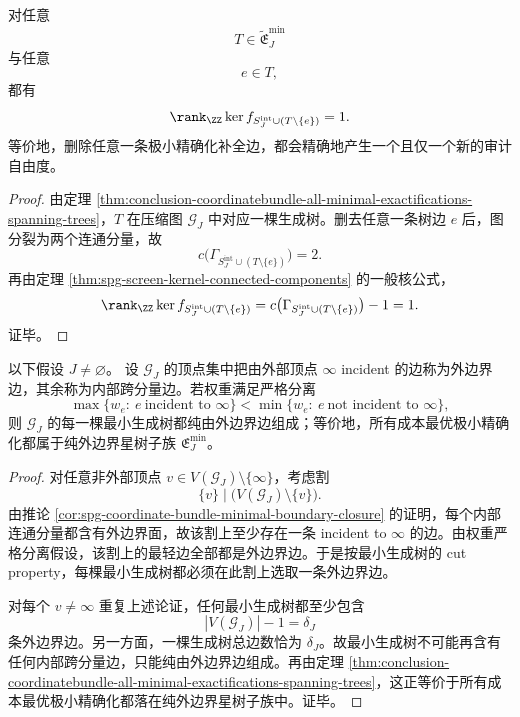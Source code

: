 \begin{theorem}[极小精确化中每一条补全边的桥边刚性]\label{thm:conclusion-coordinatebundle-minimal-exactification-bridge-rigidity}
对任意
\[
T\in \widetilde{\mathfrak E}_J^{\min}
\]
与任意
\[
e\in T,
\]
都有
\[
\rank_{\ZZ}\ker f_{S_J^{\mathrm{int}}\cup (T\setminus\{e\})}=1.
\]
等价地，删除任意一条极小精确化补全边，都会精确地产生一个且仅一个新的审计自由度。
\end{theorem}
\begin{proof}
由定理 \ref{thm:conclusion-coordinatebundle-all-minimal-exactifications-spanning-trees}，\(T\) 在压缩图 \(\mathcal G_J\) 中对应一棵生成树。删去任意一条树边 \(e\) 后，图分裂为两个连通分量，故
\[
c\bigl(\Gamma_{S_J^{\mathrm{int}}\cup (T\setminus\{e\})}\bigr)=2.
\]
再由定理 \ref{thm:spg-screen-kernel-connected-components} 的一般核公式，
\[
\rank_{\ZZ}\ker f_{S_J^{\mathrm{int}}\cup (T\setminus\{e\})}
=
c\bigl(\Gamma_{S_J^{\mathrm{int}}\cup (T\setminus\{e\})}\bigr)-1
=1.
\]
证毕。
\end{proof}

\begin{theorem}[严格边界价差强制纯星最优性]\label{thm:conclusion-coordinatebundle-strict-boundary-gap-forces-stars}
以下假设 \(J\neq\varnothing\)。
设 \(\mathcal G_J\) 的顶点集中把由外部顶点 \(\infty\) incident 的边称为外边界边，其余称为内部跨分量边。若权重满足严格分离
\[
\max\{w_e:\ e\ \text{incident to }\infty\}
<
\min\{w_e:\ e\ \text{not incident to }\infty\},
\]
则 \(\mathcal G_J\) 的每一棵最小生成树都纯由外边界边组成；等价地，所有成本最优极小精确化都属于纯外边界星树子族 \(\mathfrak E_J^{\min}\)。
\end{theorem}
\begin{proof}
对任意非外部顶点 \(v\in V(\mathcal G_J)\setminus\{\infty\}\)，考虑割
\[
\{v\}\mid\bigl(V(\mathcal G_J)\setminus\{v\}\bigr).
\]
由推论 \ref{cor:spg-coordinate-bundle-minimal-boundary-closure} 的证明，每个内部连通分量都含有外边界面，故该割上至少存在一条 incident to \(\infty\) 的边。由权重严格分离假设，该割上的最轻边全部都是外边界边。于是按最小生成树的 cut property，每棵最小生成树都必须在此割上选取一条外边界边。

对每个 \(v\neq\infty\) 重复上述论证，任何最小生成树都至少包含
\[
|V(\mathcal G_J)|-1=\delta_J
\]
条外边界边。另一方面，一棵生成树总边数恰为 \(\delta_J\)。故最小生成树不可能再含有任何内部跨分量边，只能纯由外边界边组成。再由定理 \ref{thm:conclusion-coordinatebundle-all-minimal-exactifications-spanning-trees}，这正等价于所有成本最优极小精确化都落在纯外边界星树子族中。证毕。
\end{proof}

